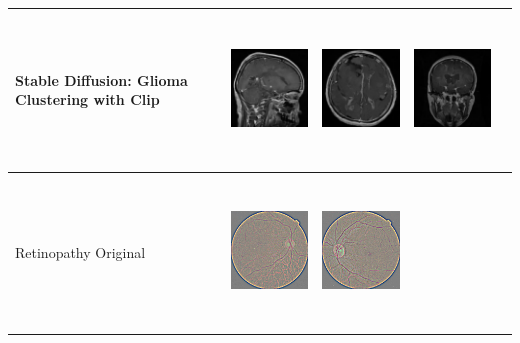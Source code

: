 \begin{table}[H]
\begin{tabularx}{\linewidth}{@{}>{\centering\arraybackslash}m{3cm}>{\centering\arraybackslash}X>{\centering\arraybackslash}X>{\centering\arraybackslash}X>{\centering\arraybackslash}X@{}}
\midrule
Stable Diffusion: Glioma Clustering with Clip &
\includegraphics[valign=M,width=\linewidth,height=4cm,keepaspectratio]{main/content/images/sd_dreambooth/dreambooth_xl_v1/mri/glioma_1.jpeg} & 
\includegraphics[valign=M,width=\linewidth,height=4cm,keepaspectratio]{main/content/images/sd_dreambooth/dreambooth_xl_v1/mri/glioma_2.jpeg} & 
\includegraphics[valign=M,width=\linewidth,height=4cm,keepaspectratio]{main/content/images/sd_dreambooth/dreambooth_xl_v1/mri/glioma_3.jpeg} \\
\midrule
Retinopathy Original &
\includegraphics[valign=M,width=\linewidth,height=4cm,keepaspectratio]{main/content/images/retinopatia_dreambooth_comparison/real/1.png} & 
\includegraphics[valign=M,width=\linewidth,height=4cm,keepaspectratio]{main/content/images/retinopatia_dreambooth_comparison/real/2.png} & 

\end{tabularx}
\end{table}

